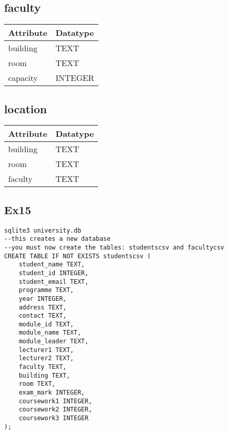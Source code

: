 \documentclass[12pt]{article}
\begin{document}
{{\subsection*{\centering faculty}
\begin{longtable}{|l|l|}
\hline
\textbf{Attribute} & \textbf{Datatype} \\ \hline
building         & TEXT                 \\ \hline
room          & TEXT                 \\ \hline
capacity          & INTEGER                 \\ \hline
\end{longtable}

\subsection*{\centering location}
\begin{longtable}{|l|l|}
\hline
\textbf{Attribute} & \textbf{Datatype} \\ \hline
building         & TEXT                 \\ \hline
room          & TEXT                 \\ \hline
faculty          & TEXT                 \\ \hline
\end{longtable}

\subsection{Ex15}
\begin{tcolorbox}[
    enhanced,
    attach boxed title to top left={xshift=6mm,yshift=-3mm},
    colback=lightgreen!20,
    colframe=lightgreen,
    colbacktitle=lightgreen,
    title=Linux shell,
    fonttitle=\bfseries\color{black},
    boxed title style={size=small,colframe=lightgreen,sharp corners},
    sharp corners,
]
\begin{verbatim}
sqlite3 university.db 
--this creates a new database
--you must now create the tables: studentscsv and facultycsv
CREATE TABLE IF NOT EXISTS studentscsv (
    student_name TEXT,
    student_id INTEGER,
    student_email TEXT,
    programme TEXT,
    year INTEGER,
    address TEXT,
    contact TEXT,
    module_id TEXT,
    module_name TEXT,
    module_leader TEXT,
    lecturer1 TEXT,
    lecturer2 TEXT,
    faculty TEXT,
    building TEXT,
    room TEXT,
    exam_mark INTEGER,
    coursework1 INTEGER,
    coursework2 INTEGER,
    coursework3 INTEGER
);


\end{verbatim}
\end{tcolorbox}}}
\end{document}

